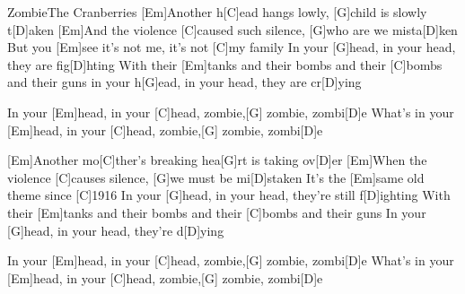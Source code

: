 \documentclass[../main.tex]{subfiles}
\begin{document}
\begin{song}{Zombie}{The Cranberries}{}
[Em]Another h[C]ead hangs lowly, [G]child is slowly t[D]aken
[Em]And the violence [C]caused such silence, [G]who are we mista[D]ken
But you [Em]see it's not me, it's not [C]my family
In your [G]head, in your head, they are fig[D]hting
With their [Em]tanks and their bombs and their [C]bombs and their guns
in your h[G]ead, in your head, they are cr[D]ying

In your [Em]head, in your [C]head, zombie,[G] zombie, zombi[D]e
What's in your [Em]head, in your [C]head, zombie,[G] zombie, zombi[D]e

[Em]Another mo[C]ther's breaking hea[G]rt is taking ov[D]er
[Em]When the violence [C]causes silence, [G]we must be mi[D]staken
It's the [Em]same old theme since [C]1916
In your [G]head, in your head, they're still f[D]ighting
With their [Em]tanks and their bombs and their [C]bombs and their guns
In your [G]head, in your head, they're d[D]ying

In your [Em]head, in your [C]head, zombie,[G] zombie, zombi[D]e
What's in your [Em]head, in your [C]head, zombie,[G] zombie, zombi[D]e
\end{song}
\end{document}
